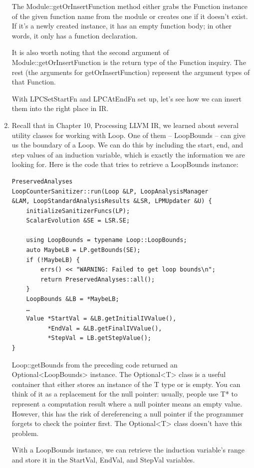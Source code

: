 \begin{enumerate}
The Module::getOrInsertFunction method either grabs the Function instance of the given function name from the module or creates one if it doesn't exist. If it's a newly created instance, it has an empty function body; in other words, it only has a function declaration.

It is also worth noting that the second argument of Module::getOrInsertFunction is the return type of the Function inquiry. The rest (the arguments for getOrInsertFunction) represent the argument types of that Function.

With LPCSetStartFn and LPCAtEndFn set up, let's see how we can insert them into the right place in IR.

\item Recall that in Chapter 10, Processing LLVM IR, we learned about several utility classes for working with Loop. One of them – LoopBounds – can give us the boundary of a Loop. We can do this by including the start, end, and step values of an induction variable, which is exactly the information we are looking for. Here is the code that tries to retrieve a LoopBounds instance:

\begin{lstlisting}[style=styleCXX]
PreservedAnalyses
LoopCounterSanitizer::run(Loop &LP, LoopAnalysisManager
&LAM, LoopStandardAnalysisResults &LSR, LPMUpdater &U) {
	initializeSanitizerFuncs(LP);
	ScalarEvolution &SE = LSR.SE;
	
	using LoopBounds = typename Loop::LoopBounds;
	auto MaybeLB = LP.getBounds(SE);
	if (!MaybeLB) {
		errs() << "WARNING: Failed to get loop bounds\n";
		return PreservedAnalyses::all();
	}
	LoopBounds &LB = *MaybeLB;
	…
	Value *StartVal = &LB.getInitialIVValue(),
		  *EndVal = &LB.getFinalIVValue(),
		  *StepVal = LB.getStepValue();
}
\end{lstlisting}

Loop::getBounds from the preceding code returned an Optional<LoopBounds> instance. The Optional<T> class is a useful container that either stores an instance of the T type or is empty. You can think of it as a replacement for the null pointer: usually, people use T* to represent a computation result where a null pointer means an empty value. However, this has the risk of dereferencing a null pointer if the programmer forgets to check the pointer first. The Optional<T> class doesn't have this problem.

With a LoopBounds instance, we can retrieve the induction variable's range and store it in the StartVal, EndVal, and StepVal variables.


\end{enumerate}
